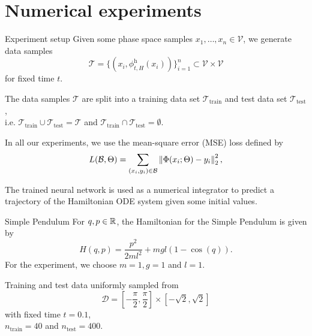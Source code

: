 \section{Numerical experiments}

\begin{frame}{Experiment setup}
  Given some phase space samples $x_1, \dots, x_n \in \mathcal{V}$, we generate data samples 
  \begin{equation*}
    \mathcal{T} = \{ (x_i, \phi^{\text{h}}_{t,H}(x_i)) \}_{i=1}^{n}
    \subset \mathcal{V} \times \mathcal{V}
  \end{equation*}
  for fixed time $t$.

  \vspace{0.3cm}
  The data samples $\mathcal{T}$ are split into a training data set 
  $\mathcal{T}_{\text{train}}$ and test data set $\mathcal{T}_{\text{test}}$,\\
  i.e. $\mathcal{T}_{\text{train}} \cup \mathcal{T}_{\text{test}} = \mathcal{T}$
  and $\mathcal{T}_{\text{train}} \cap \mathcal{T}_{\text{test}} = \emptyset$.

  \vspace{0.6cm}
  In all our experiments, we use the mean-square error (MSE) loss defined by
  \begin{equation*}
    L(\mathcal{B}, \Theta) = \sum_{(x_i, y_i) \in \mathcal{B}} \left\lVert{\Phi(x_i; \Theta) - y_i}\right\rVert^2_2
    ,
  \end{equation*}

   The trained neural network is used as a numerical integrator
  to predict a trajectory of the Hamiltonian ODE system given some initial values.
\end{frame}

\begin{frame}[c]{Simple Pendulum}
  For $q,p \in \mathbb{R}$, the Hamiltonian for the Simple Pendulum is given by
  \begin{equation*}
    H(q,p) = \frac{p^2}{2ml^2} + mgl (1-\cos(q))
    .
  \end{equation*}
  For the experiment, we choose $m=1, g=1$ and $l=1$.

  \vspace{0.6cm}
  Training and test data uniformly sampled from
  \begin{equation*}
    \mathcal{D} = [-\frac{\pi}{2}, \frac{\pi}{2}] \times [-\sqrt{2}, \sqrt{2}]
  \end{equation*}
  with fixed time $t = 0.1$,\\
  $n_{\text{train}} = 40$ and $n_{\text{test}} = 400$.
\end{frame}

